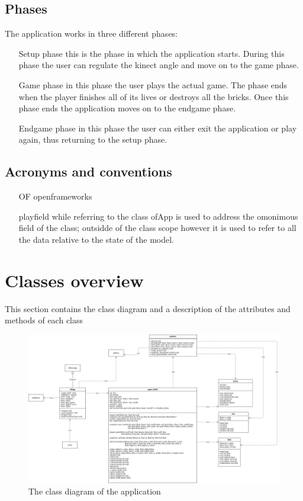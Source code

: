 \documentclass[]{article}
\begin{document}
\subsection{Phases}
The application works in three different phases:
\begin{itemize}
	\item [Setup phase] this is the phase in which the application starts. During this phase the user can regulate the kinect angle and move on to the game phase.
	\item  [Game phase] in this phase the user plays the actual game. The phase ends when the player finishes all of its lives or destroys all the bricks. Once this phase ends the application moves on to the endgame phase.
	\item [Endgame phase] in this phase the user can either exit the application or play again, thus returning to the setup phase. 
\end{itemize}
\subsection{Acronyms and conventions}
\begin{itemize}
	\item [OF] openframeworks
	\item [playfield] while referring to the class ofApp is used to address the omonimous field of the class; outsidde of the class scope however it is used to refer to all the data relative to the state of the model.
\end{itemize}
\newpage
\section{Classes overview}
This section contains the class diagram and a description of the attributes and methods of each class
\begin{figure}[h!]
    \centering
    \includegraphics[angle=90, scale=0.25]{calss_diagram_mod.jpg}
    \caption{The class diagram of the application}
    \label{fig:Class diagram}
\end{figure}
\end{document}
